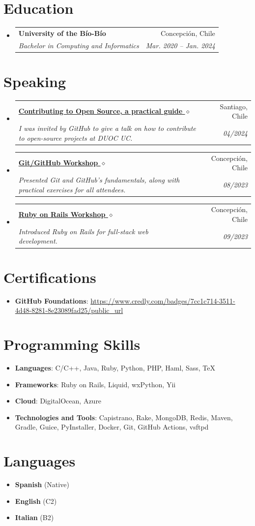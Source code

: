 \documentclass[letterpaper,11pt]{article}
\makeatletter
\newcommand{\resumeSubheading}[4]{
	\vspace{-1pt}\item
	\begin{tabular*}{0.97\textwidth}[t]{l@{\extracolsep{\fill}}r}
		\textbf{#1} & #2 \\
		\textit{\small#3} & \textit{\small #4} \\
	\end{tabular*}\vspace{-5pt}
}
\newcommand{\resumeSubHeadingListStart}{\begin{itemize}[leftmargin=*]}
\newcommand{\resumeSubHeadingListEnd}{\end{itemize}}
\makeatother
\begin{document}
	\section{Education}
	\resumeSubHeadingListStart
	\resumeSubheading
	{University of the Bío-Bío}{Concepción, Chile}
	{Bachelor in Computing and Informatics}{Mar. 2020 -- Jan. 2024}
	\resumeSubHeadingListEnd
	
	\section{Speaking}
	\resumeSubHeadingListStart
	\resumeSubheading
	{\href{https://youtu.be/S_qkjY7k_L8?t=2698}{Contributing to Open Source, a practical guide $\diamond$}}{Santiago, Chile}
	{I was invited by GitHub to give a talk on how to contribute to open-source projects at DUOC UC.}{04/2024}
	\resumeSubheading
	{\href{https://bgm.dev/about}{Git/GitHub Workshop $\diamond$}}{Concepción, Chile}
	{Presented Git and GitHub’s fundamentals, along with practical exercises for all attendees.}{08/2023}
	\resumeSubheading
	{\href{https://bgm.dev/about}{Ruby on Rails Workshop $\diamond$}}{Concepción, Chile}
	{Introduced Ruby on Rails for full-stack web development.}{09/2023}
	\resumeSubHeadingListEnd
	
	\section{Certifications}
	\resumeSubHeadingListStart
	\item{
		\textbf{GitHub Foundations}{: \url{https://www.credly.com/badges/7cc1c714-3511-4d48-8281-8e23089fad25/public_url}}
	}
	\resumeSubHeadingListEnd
	
	\section{Programming Skills}
	\resumeSubHeadingListStart
	\item{
		\textbf{Languages}{: C/C++, Java, Ruby, Python, PHP, Haml, Sass, TeX}
	}
	\item{
		\textbf{Frameworks}{: Ruby on Rails, Liquid, wxPython, Yii}
	}
	\item{
		\textbf{Cloud}{: DigitalOcean, Azure}
	}
	\item{
		\textbf{Technologies and Tools}{: Capistrano, Rake, MongoDB, Redis, Maven, Gradle, Guice, PyInstaller, Docker, Git, GitHub Actions, vsftpd}
	}
	\resumeSubHeadingListEnd
	
	\section{Languages}
	\resumeSubHeadingListStart
	\item{
		\textbf{Spanish}{ (Native)}
	}
	\item{
		\textbf{English}{ (C2)}
	}
	\item{
		\textbf{Italian}{ (B2)}
	}
	\resumeSubHeadingListEnd
	
\end{document}
